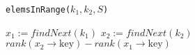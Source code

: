 \documentclass[../main.tex]{subfiles}
\begin{document}
\begin{algorithm}[H]
\caption{\texttt{elemsInRange(\(k_{1}, k_{2}, S\))}}
\label{alg:ex2.elemsInRange}
\begin{algorithmic}
  \State \(x_{1} := findNext(k_{1})\)
  \State \(x_{2} := findNext(k_{2})\)
  \State \Return \(rank(x_{2} \rightarrow \text{key}) - rank(x_{1} \rightarrow \text{key})\)
\end{algorithmic}
\end{algorithm}

\end{document}

